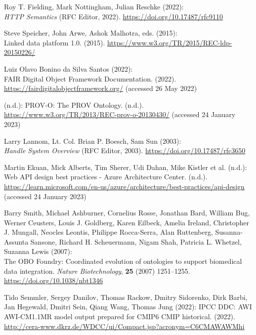 \begin{thebibliography}{9}
Roy T. Fielding, Mark Nottingham, Julian Reschke (2022): \\
\emph{{HTTP
Semantics}} ({RFC Editor}, 2022).
\url{https://doi.org/10.17487/rfc9110}

Steve Speicher, John Arwe, Ashok Malhotra, eds. (2015): \\
Linked data
platform 1.0. (2015). \url{https://www.w3.org/TR/2015/REC-ldp-20150226/}

Luiz Olavo Bonino da Silva Santos (2022): \\
{FAIR Digital Object Framework
Documentation}. (2022). \url{https://fairdigitalobjectframework.org/}
(accessed 26 May 2022)

(n.d.): {PROV-O}: {The PROV Ontology}. (n.d.).
\url{https://www.w3.org/TR/2013/REC-prov-o-20130430/} (accessed 24
January 2023)

Larry Lannom, Lt. Col. Brian P. Boesch, Sam Sun (2003): \\
\emph{Handle
{System Overview}} ({RFC Editor}, 2003).
\url{https://doi.org/10.17487/rfc3650}

Martin Ekuan, Mick Alberts, Tim Sherer, Udi Dahan, Mike Kistler et
al. (n.d.): Web {API} design best practices - {Azure Architecture
Center}. (n.d.).
\url{https://learn.microsoft.com/en-us/azure/architecture/best-practices/api-design}
(accessed 24 January 2023)

Barry Smith, Michael Ashburner, Cornelius Rosse, Jonathan Bard, William
Bug, Werner Ceusters, Louis J. Goldberg, Karen Eilbeck, Amelia Ireland,
Christopher J. Mungall, Neocles Leontis, Philippe Rocca-Serra, Alan
Ruttenberg, Susanna-Assunta Sansone, Richard H. Scheuermann, Nigam Shah,
Patricia L. Whetzel, Suzanna Lewis (2007): \\
The {OBO Foundry}:
Coordinated evolution of ontologies to support biomedical data
integration. \emph{Nature Biotechnology}, \textbf{25} (2007) 1251--1255.
\url{https://doi.org/10.1038/nbt1346}

Tido Semmler, Sergey Danilov, Thomas Rackow, Dmitry Sidorenko, Dirk
Barbi, Jan Hegewald, Dmitri Sein, Qiang Wang, Thomas Jung (2022):
IPCC DDC: AWI AWI-CM1.1MR model output prepared for CMIP6 CMIP
historical. (2022).
\url{http://cera-www.dkrz.de/WDCC/ui/Compact.jsp?acronym=C6CMAWAWMhi}


\end{thebibliography}
